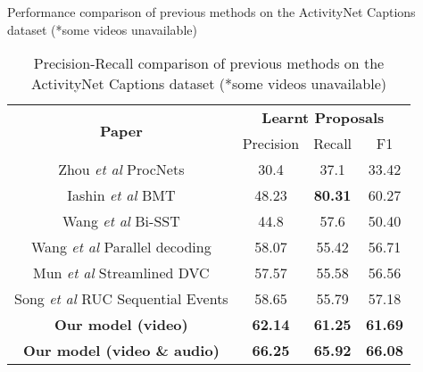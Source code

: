 \begin{table}[]
	\centering
	\caption{Performance comparison of previous methods on the ActivityNet Captions dataset (*some videos unavailable)}  \label{tab: performance-comparison}
	
\end{table}

\begin{table}[]
	\centering
	\begin{tabular}{|c|ccc|}
		\hline
		\multirow{2}{*}{\textbf{Paper}} & \multicolumn{3}{c|}{\textbf{Learnt Proposals}}                                             \\ \cline{2-4} 
		& \multicolumn{1}{c|}{Precision}      & \multicolumn{1}{c|}{Recall}         & F1             \\ \hline
		Zhou \textit{et al} \cite{zhou2017automatic} ProcNets                   & \multicolumn{1}{c|}{30.4}           & \multicolumn{1}{c|}{37.1}           & 33.42          \\ \hline
		Iashin \textit{et al} \cite{iashin2020better} BMT                             & \multicolumn{1}{c|}{48.23}          & \multicolumn{1}{c|}{\textbf{80.31}}          & 60.27          \\ \hline
		{Wang \textit{et al} \cite{wang2018bidirectional} Bi-SST}             & \multicolumn{1}{c|}{44.8}           & \multicolumn{1}{c|}{57.6}           & 50.40          \\ \hline
		Wang \textit{et al} \cite{wang2021endtoend} Parallel decoding                            & \multicolumn{1}{c|}{58.07}          & \multicolumn{1}{c|}{55.42}          & 56.71          \\ \hline
		{Mun \textit{et al} \cite{mun2019streamlined} Streamlined DVC}                 & \multicolumn{1}{c|}{57.57}          & \multicolumn{1}{c|}{55.58}          & 56.56          \\ \hline
		Song \textit{et al} \cite{songruc} RUC Sequential Events           & \multicolumn{1}{c|}{58.65}          & \multicolumn{1}{c|}{55.79}          & 57.18          \\ \hline
		\textbf{Our model (video)}              & \multicolumn{1}{c|}{\textbf{62.14}} & \multicolumn{1}{c|}{\textbf{61.25}} & \textbf{61.69} \\ \hline
		\textbf{Our model (video \& audio)}              & \multicolumn{1}{c|}{\textbf{66.25}} & \multicolumn{1}{c|}{\textbf{65.92}} & \textbf{66.08} \\ \hline
	\end{tabular}

	\centering
	\caption{Precision-Recall comparison of previous methods on the ActivityNet Captions dataset (*some videos unavailable)}  \label{tab: precision-recall-comparison}
\end{table}



